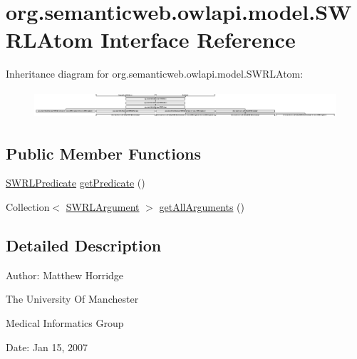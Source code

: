 \hypertarget{interfaceorg_1_1semanticweb_1_1owlapi_1_1model_1_1_s_w_r_l_atom}{\section{org.\-semanticweb.\-owlapi.\-model.\-S\-W\-R\-L\-Atom Interface Reference}
\label{interfaceorg_1_1semanticweb_1_1owlapi_1_1model_1_1_s_w_r_l_atom}
}
Inheritance diagram for org.\-semanticweb.\-owlapi.\-model.\-S\-W\-R\-L\-Atom\-:\begin{figure}[H]
\begin{center}
\leavevmode
\includegraphics[height=1.022831cm]{interfaceorg_1_1semanticweb_1_1owlapi_1_1model_1_1_s_w_r_l_atom}
\end{center}
\end{figure}
\subsection*{Public Member Functions}
\begin{DoxyCompactItemize}
\item 
\hyperlink{interfaceorg_1_1semanticweb_1_1owlapi_1_1model_1_1_s_w_r_l_predicate}{S\-W\-R\-L\-Predicate} \hyperlink{interfaceorg_1_1semanticweb_1_1owlapi_1_1model_1_1_s_w_r_l_atom_a888664ac67b2879605e452860b29edc6}{get\-Predicate} ()
\item 
Collection$<$ \hyperlink{interfaceorg_1_1semanticweb_1_1owlapi_1_1model_1_1_s_w_r_l_argument}{S\-W\-R\-L\-Argument} $>$ \hyperlink{interfaceorg_1_1semanticweb_1_1owlapi_1_1model_1_1_s_w_r_l_atom_a0afa3bc16be8a914a480c26614d81bdb}{get\-All\-Arguments} ()
\end{DoxyCompactItemize}


\subsection{Detailed Description}
Author\-: Matthew Horridge\par
 The University Of Manchester\par
 Medical Informatics Group\par
 Date\-: Jan 15, 2007\par
\par
 

